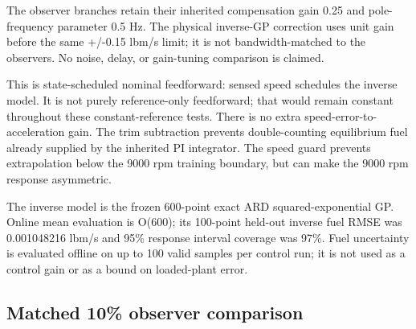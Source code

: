 The observer branches retain their inherited compensation gain 0.25 and pole-frequency parameter 0.5 Hz. The physical inverse-GP correction uses unit gain before the same +/-0.15 lbm/s limit; it is not bandwidth-matched to the observers. No noise, delay, or gain-tuning comparison is claimed.

This is state-scheduled nominal feedforward: sensed speed schedules the inverse model. It is not purely reference-only feedforward; that would remain constant throughout these constant-reference tests. There is no extra speed-error-to-acceleration gain. The trim subtraction prevents double-counting equilibrium fuel already supplied by the inherited PI integrator. The speed guard prevents extrapolation below the 9000 rpm training boundary, but can make the 9000 rpm response asymmetric.

The inverse model is the frozen 600-point exact ARD squared-exponential GP. Online mean evaluation is O(600); its 100-point held-out inverse fuel RMSE was 0.001048216 lbm/s and 95\% response interval coverage was 97\%. Fuel uncertainty is evaluated offline on up to 100 valid samples per control run; it is not used as a control gain or as a bound on loaded-plant error.

\subsection{Matched 10\% observer comparison}

